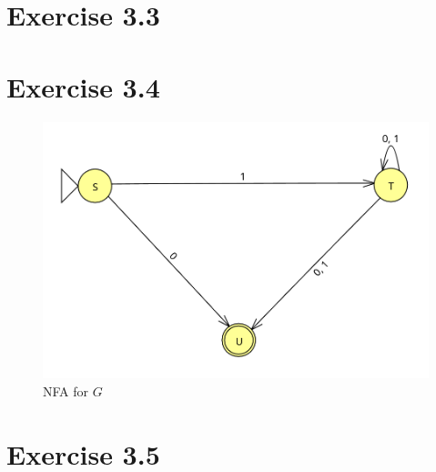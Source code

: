 \documentclass{article} %
\newcommand{\homeworkNumber}{3}
\begin{document}
\section*{Exercise \homeworkNumber.3}


\clearpage

\section*{Exercise \homeworkNumber.4}
\begin{figure}[h]
		\includegraphics[width=\linewidth]{ex4.png}
		\centering
		\caption{NFA for $G$}
	\end{figure}

\section*{Exercise \homeworkNumber.5}
\end{document}
